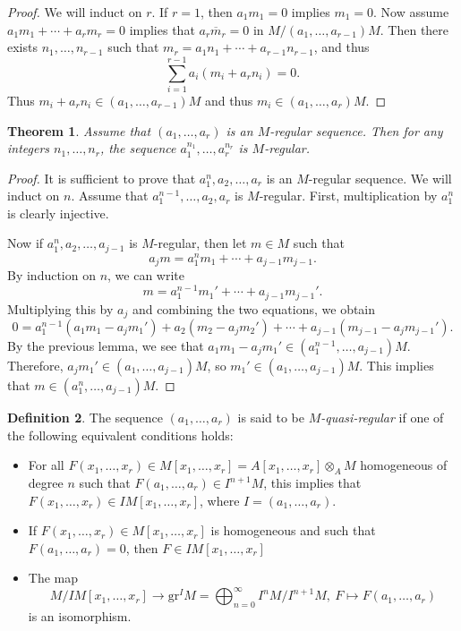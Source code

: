 \documentclass[leqno, openany]{memoir}
\newtheorem{thm}{Theorem}[section]
\theoremstyle{definition}
\newtheorem{defn}[thm]{Definition}
\theoremstyle{remark}
\theoremstyle{plain}
\theoremstyle{definition}
\theoremstyle{remark}
\newcommand{\mr}[1]{\mathrm{#1}}
\newcommand{\ol}[1]{\overline{#1}}
\begin{document}
\begin{proof}
    We will induct on $r$. If $r = 1$, then $a_1 m_1 = 0$ implies $m_1 = 0$. Now assume $a_1 m_1 + \cdots + a_r m_r = 0$ implies that $a_r \ol{m}_r = 0$ in $M / (a_1, \ldots, a_{r-1}) M$. Then there exists $n_1, \ldots, n_{r-1}$ such that $m_r = a_1 n_1 + \cdots + a_{r-1} n_{r-1}$, and thus
    \[ \sum_{i=1}^{r-1} a_i (m_i + a_r n_i) = 0. \]
    Thus $m_i + a_r n_i \in (a_1, \ldots, a_{r-1})M$ and thus $m_i \in (a_1, \ldots, a_r)M$.
\end{proof}

\begin{thm}
    Assume that $(a_1, \ldots, a_r)$ is an $M$-regular sequence. Then for any integers $n_1, \ldots, n_r$, the sequence $a_1^{n_1}, \ldots, a_r^{n_r}$ is $M$-regular. 
\end{thm}

\begin{proof}
    It is sufficient to prove that $a_1^n, a_2, \ldots, a_r$ is an $M$-regular sequence. We will induct on $n$. Assume that $a_1^{n-1}, \ldots, a_2, a_r$ is $M$-regular. First, multiplication by $a_1^n$ is clearly injective. 

    Now if $a_1^n, a_2, \ldots, a_{j-1}$ is $M$-regular, then let $m \in M$ such that 
    \[ a_j m = a_1^n m_1 + \cdots + a_{j-1} m_{j-1}. \]
    By induction on $n$, we can write
    \[ m = a_1^{n-1} m_1' + \cdots + a_{j-1} m_{j-1}'. \]
    Multiplying this by $a_j$ and combining the two equations, we obtain
    \[ 0 = a_1^{n-1}(a_1 m_1 - a_jm_1') + a_2(m_2 - a_jm_2') + \cdots + a_{j-1}(m_{j-1} - a_j m_{j-1}'). \]
    By the previous lemma, we see that $a_1 m_1 - a_j m_1' \in (a_1^{n-1}, \ldots, a_{j-1})M$. Therefore, $a_j m_1' \in (a_1, \ldots, a_{j-1})M$, so $m_1' \in (a_1, \ldots, a_{j-1})M$. This implies that $m \in (a_1^n, \ldots, a_{j-1})M$.
\end{proof}

\begin{defn}
    The sequence $(a_1, \ldots, a_r)$ is said to be \textit{$M$-quasi-regular} if one of the following equivalent conditions holds:
    \begin{itemize}
        \item For all $F(x_1, \ldots, x_r) \in M[x_1, \ldots, x_r] = A[x_1, \ldots, x_r] \otimes_A M$ homogeneous of degree $n$ such that $F(a_1, \ldots, a_r) \in I^{n+1}M$, this implies that $F(x_1, \ldots, x_r) \in IM[x_1, \ldots, x_r]$, where $I = (a_1, \ldots, a_r)$.
        \item If $F(x_1, \ldots, x_r) \in M[x_1, \ldots, x_r]$ is homogeneous and such that $F(a_1, \ldots, a_r) = 0$, then $F \in IM[x_1, \ldots, x_r]$ 
            \item The map
            \[ M/IM[x_1, \ldots, x_r] \to \mr{gr}^I M = \bigoplus_{n=0}^{\infty} I^n M / I^{n+1}M,\ F \mapsto F(a_1, \ldots, a_r) \]
            is an isomorphism.
    \end{itemize}
\end{defn}
\end{document}
